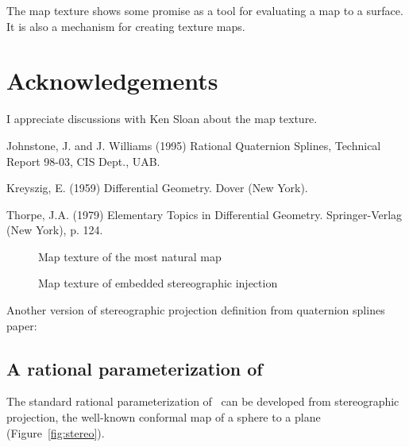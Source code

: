 The map texture shows some promise as a tool for evaluating a map to a surface.
It is also a mechanism for creating texture maps.

\section{Acknowledgements}

I appreciate discussions with Ken Sloan about the map texture.


\begin{thebibliography}{Ebbinghaus 90}

Johnstone, J. and J. Williams (1995)
Rational Quaternion Splines,
Technical Report 98-03, CIS Dept., UAB.

Kreyszig, E. (1959) Differential Geometry.
Dover (New York).

Thorpe, J.A. (1979) Elementary Topics in Differential Geometry.
Springer-Verlag (New York), p. 124.

\end{thebibliography}

\clearpage

\begin{figure}
\vspace{3.5in}
\caption{Map texture of the most natural map}
\label{fig:textureperfect}
\end{figure}

\begin{figure}
\vspace{3.5in}
\caption{Map texture of embedded stereographic injection}
\label{fig:texturestereo}
\end{figure}

Another version of stereographic projection definition from quaternion splines paper:

\subsection{A rational parameterization of }

The standard rational parameterization of \ 
can be developed from stereographic projection,
the well-known conformal map of a sphere to a plane (Figure~\ref{fig:stereo}). 

